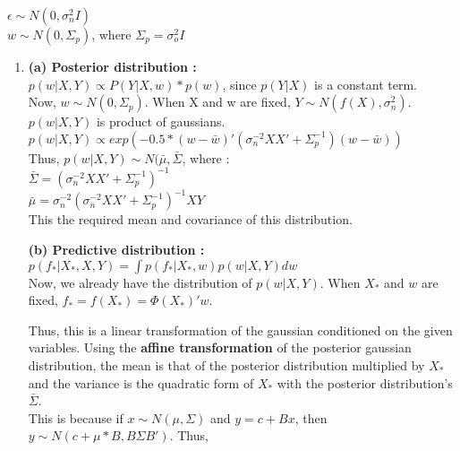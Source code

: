 \begin{enumerate}
{	$\epsilon \sim N(0, \sigma_{n}^{2}I)$\\
	
	$w \sim N(0, \Sigma_{p})$, where $\Sigma_{p} = \sigma_{o}^{2}I$ \\
			
	\begin{enumerate}
	\item{
		\textbf{(a) Posterior distribution :}\\
		
		$ p(w | X,Y) \propto P(Y |X,w) * p(w)$, since $p(Y |X)$ is a constant term.\\		

		Now, $w \sim N(0, \Sigma_{p})$. When X and w are fixed, $Y \sim N(f(X), \sigma_{n}^{2})$.\\
		
		$ p(w|X,Y)$ is product of gaussians.\\  
			
		$ p(w|X,Y) \propto exp(-0.5*(w- \bar{w} )'(\sigma_{n}^{-2}XX' + \Sigma_{p}^{-1})(w- \bar{w} ))$\\			

		Thus, 	$ p(w|X,Y) \sim N (\bar{\mu}, \bar{\Sigma}$, where :\\

		$\bar{\Sigma	} = (\sigma_{n}^{-2}XX' + \Sigma_{p}^{-1})^{-1}$\\	

		$\bar{\mu} = \sigma_{n}^{-2}(\sigma_{n}^{-2}XX' + \Sigma_{p}^{-1})^{-1}XY$\\		
		
		This the required mean and covariance of this distribution.
		
		\textbf{(b) Predictive distribution :}\\

		$p(f_{*} | X_{*},X,Y) = \int p(f_{*} | X_{*},w) p(w| X,Y) dw$\\
		
		Now, we already have the distribution of $p(w| X,Y)$. When $X_{*}$ and $w$ are fixed, $f_{*} = f(X_{*}) = \Phi(X_{*})'w$.
		
		Thus, this is a linear transformation of the gaussian conditioned on the given variables. Using the \textbf{affine transformation} of the posterior gaussian distribution, the mean is that of the posterior distribution multiplied by $X_{*}$ and the variance is the quadratic form of $X_{*}$ with the posterior distribution's $\bar{\Sigma}$.\\
		
		This is because if $x \sim N(\mu, \Sigma)$ and $y = c + Bx$, then $y \sim N(c + \mu*B, B\Sigma B')$. Thus, \\
		
}
\end{enumerate}}
\end{enumerate}
